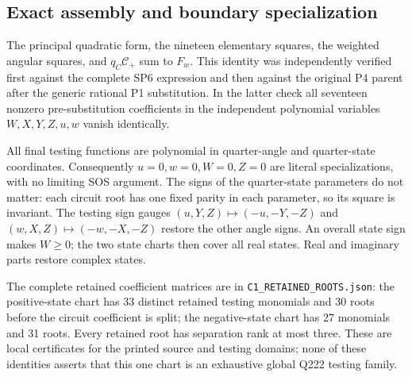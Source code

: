 \subsection{Exact assembly and boundary specialization}

The principal quadratic form, the nineteen elementary squares,
the weighted angular squares, and $q_C\mathscr C_+$ sum to $F_w$.
This identity was independently verified first against the complete
SP6 expression and then against the original P4 parent after the
generic rational P1 substitution. In the latter check all seventeen
nonzero pre-substitution coefficients in the independent polynomial
variables $W,X,Y,Z,u,w$ vanish identically.

All final testing functions are polynomial in quarter-angle and
quarter-state coordinates. Consequently $u=0,w=0,W=0,Z=0$ are
literal specializations, with no limiting SOS argument. The signs
of the quarter-state parameters do not matter: each circuit root
has one fixed parity in each parameter, so its square is invariant.
The testing sign gauges
$(u,Y,Z)\mapsto(-u,-Y,-Z)$ and
$(w,X,Z)\mapsto(-w,-X,-Z)$ restore the other angle signs. An overall
state sign makes $W\ge0$; the two state charts then cover all real
states. Real and imaginary parts restore complex states.

The complete retained coefficient matrices are in
\texttt{C1\_RETAINED\_ROOTS.json}: the positive-state chart has
33 distinct retained testing monomials and 30 roots before the
circuit coefficient is split; the negative-state chart has 27
monomials and 31 roots. Every retained root has separation rank at
most three. These are local certificates for the printed source
and testing domains; none of these identities asserts that this
one chart is an exhaustive global Q222 testing family.
